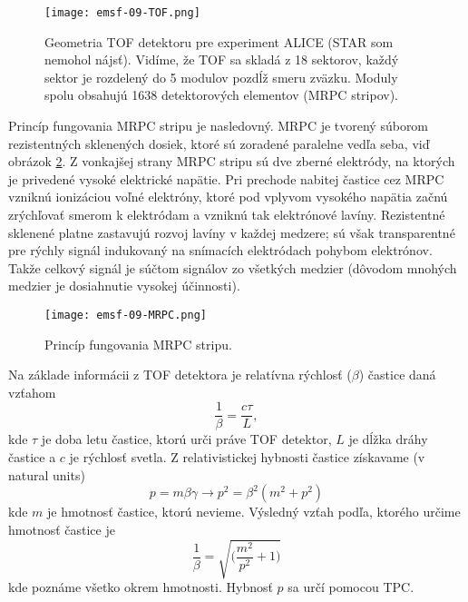 \documentclass[../../main.tex]{subfiles}
\begin{document}
\begin{figure}[!h]
\texttt{[image: emsf-09-TOF.png]}
\centering
\caption{Geometria TOF detektoru pre experiment ALICE (STAR som nemohol nájsť). Vidíme, že TOF sa skladá z 18 sektorov, každý sektor je rozdelený do 5 modulov pozdĺž smeru zväzku. Moduly spolu obsahujú 1638 detektorových elementov (MRPC stripov).}
\label{em9:fig:TOF}
\end{figure}

Princíp fungovania MRPC stripu je nasledovný. MRPC je tvorený súborom rezistentných sklenených dosiek, ktoré sú zoradené paralelne vedľa seba, viď obrázok \ref{em9:fig:MRPC}. Z vonkajšej strany MRPC stripu sú dve zberné elektródy, na ktorých je privedené vysoké elektrické napätie. Pri prechode nabitej častice cez MRPC vzniknú ionizáciou voľné elektróny, ktoré pod vplyvom vysokého napätia začnú zrýchľovať smerom k elektródam a vzniknú tak elektrónové lavíny. Rezistentné sklenené platne zastavujú rozvoj lavíny v každej medzere; sú však transparentné pre rýchly signál indukovaný na snímacích elektródach pohybom elektrónov. Takže celkový signál je súčtom signálov zo všetkých medzier (dôvodom mnohých medzier je dosiahnutie vysokej účinnosti).

\begin{figure}[!h]
\texttt{[image: emsf-09-MRPC.png]}
\centering
\caption{Princíp fungovania MRPC stripu.}
\label{em9:fig:MRPC}
\end{figure}

Na základe informácii z TOF detektora je relatívna rýchlosť ($\beta$) častice daná vzťahom
$$ \frac{1}{\beta} = \frac{c\tau}{L}, $$
kde $\tau$ je doba letu častice, ktorú urči práve TOF detektor, $L$ je dĺžka dráhy častice a $c$ je rýchlosť svetla.
Z relativistickej hybnosti častice získavame (v natural units)
$$ p = m \beta \gamma  \rightarrow p^2 = \beta^2 (m^2+p^2)$$
kde $m$ je hmotnosť častice, ktorú nevieme. Výsledný vzťah podľa, ktorého určime hmotnosť častice je
$$ \frac{1}{\beta} = \sqrt{\bigg( \frac{m^2}{p^2}+1 \bigg)} $$
kde poznáme všetko okrem hmotnosti. Hybnosť $p$ sa určí pomocou TPC.
\end{document}
